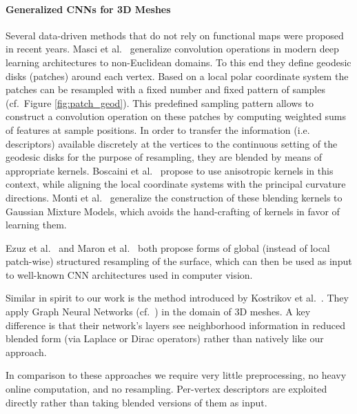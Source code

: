 \documentclass[runningheads]{llncs}
\begin{document}
\paragraph{\textbf{Generalized CNNs for 3D Meshes}}
Several data-driven methods that do not rely on functional maps were proposed in recent years.
Masci et al.~\cite{masci2015geodesic} generalize convolution operations in modern deep learning architectures to non-Euclidean domains.
To this end they define geodesic disks (patches) around each vertex. Based on a local polar coordinate system the patches can be resampled with a fixed number and fixed pattern of samples (cf.\ Figure \ref{fig:patch_geod}). This predefined sampling pattern allows to construct a convolution operation on these patches by computing weighted sums of features at sample positions.
In order to transfer the information (i.e. descriptors) available discretely at the vertices to the continuous setting of the geodesic disks for the purpose of resampling, they are blended by means of appropriate kernels.
Boscaini et al.~\cite{boscaini2016learning} propose to use anisotropic kernels in this context, while aligning the local coordinate systems with the principal curvature directions.
Monti et al.~\cite{monti2017geometric} generalize the construction of these blending kernels to Gaussian Mixture Models, which avoids the  hand-crafting of kernels in favor of learning them.

Ezuz et al.~\cite{ezuz2017gwcnn} and Maron et al.~\cite{maron2017convolutional} both propose forms of global (instead of local patch-wise) structured resampling of the surface,
which can then be used as input to well-known CNN architectures used in computer vision.

Similar in spirit to our work is the method introduced by Kostrikov et al.~\cite{kostrikov2017surface}. They apply Graph Neural Networks (cf.~\cite{scarselli2009graph,defferrard2016convolutional,niepert2016learning}) in the domain of 3D meshes.
A key difference is that their network's layers see neighborhood information in reduced blended form (via Laplace or Dirac operators) rather than natively like our approach.

In comparison to these approaches we require very little preprocessing, no heavy online computation, and no resampling. Per-vertex descriptors are exploited directly rather than taking blended versions of them as input.
\end{document}
